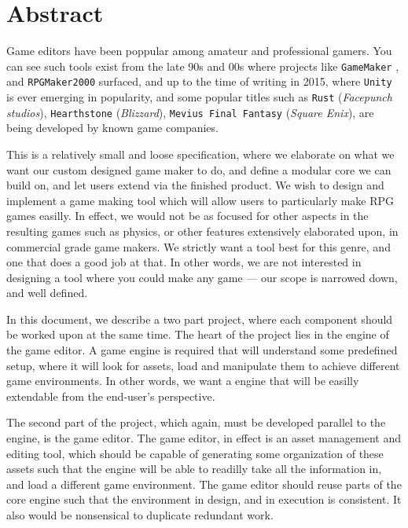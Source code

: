 \section{Abstract}

Game editors have been poppular among amateur and professional gamers. You can
see such tools exist from the late 90s and 00s where projects like
\texttt{GameMaker} \cite{gamemaker}, and \texttt{RPGMaker2000}
\cite{rpgmaker2000} surfaced, and up to the time of writing in 2015, where
\texttt{Unity} is ever emerging in popularity, and some popular titles such as
\texttt{Rust} (\textit{Facepunch studios}), \texttt{Hearthstone}
(\textit{Blizzard}), \texttt{Mevius Final Fantasy} (\textit{Square Enix}), are being
developed by known game companies.

This is a relatively small and loose specification, where we elaborate on what
we want our custom designed game maker to do, and define a modular core we can
build on, and let users extend via the finished product. We wish to design and
implement a game making tool which will allow users to particularly make RPG
games easilly. In effect, we would not be as focused for other aspects in the
resulting games such as physics, or other features extensively elaborated upon,
in commercial grade game makers. We strictly want a tool best for this genre,
and one that does a good job at that. In other words, we are not interested in
designing a tool where you could make any game --- our scope is narrowed down,
and well defined.

In this document, we describe a two part project, where each component should be
worked upon at the same time. The heart of the project lies in the engine of the
game editor. A game engine is required that will understand some predefined
setup, where it will look for assets, load and manipulate them to achieve
different game environments. In other words, we want a engine that will be
easilly extendable from the end-user's perspective.

The second part of the project, which again, must be developed parallel to the
engine, is the game editor. The game editor, in effect is an asset management
and editing tool, which should be capable of generating some organization of
these assets such that the engine will be able to readilly take all the
information in, and load a different game environment. The game editor should
reuse parts of the core engine such that the environment in design, and in
execution is consistent. It also would be nonsensical to duplicate redundant
work.

